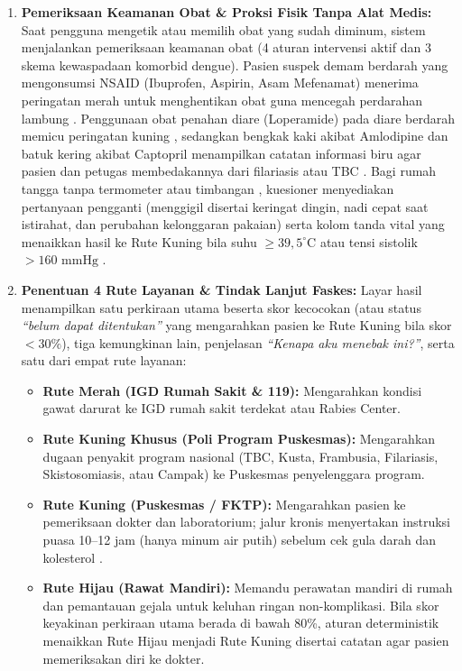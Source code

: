 \begin{enumerate}
    \item \textbf{Pemeriksaan Keamanan Obat \& Proksi Fisik Tanpa Alat Medis:} 
    Saat pengguna mengetik atau memilih obat yang sudah diminum, sistem menjalankan pemeriksaan keamanan obat (4 aturan intervensi aktif dan 3 skema kewaspadaan komorbid dengue). Pasien suspek demam berdarah yang mengonsumsi NSAID (Ibuprofen, Aspirin, Asam Mefenamat) menerima peringatan merah untuk menghentikan obat guna mencegah perdarahan lambung \citep{Alam2022,Mohiuddin2023,Tovar2024}. Penggunaan obat penahan diare (Loperamide) pada diare berdarah memicu peringatan kuning \citep{Koo2007,Schiller2020}, sedangkan bengkak kaki akibat Amlodipine dan batuk kering akibat Captopril menampilkan catatan informasi biru agar pasien dan petugas membedakannya dari filariasis atau TBC \citep{Liang2022,Savage2020,Sica2003,Dicpinigaitis2014}. Bagi rumah tangga tanpa termometer atau timbangan \citep{Kemenkes2024}, kuesioner menyediakan pertanyaan pengganti (menggigil disertai keringat dingin, nadi cepat saat istirahat, dan perubahan kelonggaran pakaian) serta kolom tanda vital yang menaikkan hasil ke Rute Kuning bila suhu $\ge 39,5^\circ\text{C}$ atau tensi sistolik $>160\text{ mmHg}$ \citep{PERKENI2024}.

    \item \textbf{Penentuan 4 Rute Layanan \& Tindak Lanjut Faskes:} 
    Layar hasil menampilkan satu perkiraan utama beserta skor kecocokan (atau status \textit{``belum dapat ditentukan''} yang mengarahkan pasien ke Rute Kuning bila skor $<30\%$), tiga kemungkinan lain, penjelasan \textit{``Kenapa aku menebak ini?''}, serta satu dari empat rute layanan:
    \begin{itemize}
        \item \textbf{Rute Merah (IGD Rumah Sakit \& 119):} Mengarahkan kondisi gawat darurat ke IGD rumah sakit terdekat atau Rabies Center.
        \item \textbf{Rute Kuning Khusus (Poli Program Puskesmas):} Mengarahkan dugaan penyakit program nasional (TBC, Kusta, Frambusia, Filariasis, Skistosomiasis, atau Campak) ke Puskesmas penyelenggara program.
        \item \textbf{Rute Kuning (Puskesmas / FKTP):} Mengarahkan pasien ke pemeriksaan dokter dan laboratorium; jalur kronis menyertakan instruksi puasa 10--12 jam (hanya minum air putih) sebelum cek gula darah dan kolesterol \citep{PERKENI2024}.
        \item \textbf{Rute Hijau (Rawat Mandiri):} Memandu perawatan mandiri di rumah dan pemantauan gejala untuk keluhan ringan non-komplikasi. Bila skor keyakinan perkiraan utama berada di bawah 80\%, aturan deterministik menaikkan Rute Hijau menjadi Rute Kuning disertai catatan agar pasien memeriksakan diri ke dokter.
    \end{itemize}
\end{enumerate}

